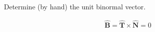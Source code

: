 Determine (by hand) the unit binormal vector.

\begin{solution}
\begin{align*}
    \boldsymbol{\hat{B}} = \boldsymbol{\hat{T}} \times \boldsymbol{\hat{N}} = 0
\end{align*}
\end{solution}